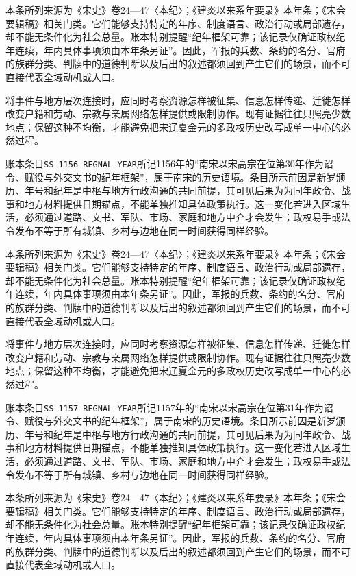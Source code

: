本条所列来源为《宋史》卷24—47〈本纪〉；《建炎以来系年要录》本年条；《宋会要辑稿》相关门类。它们能够支持特定的年序、制度语言、政治行动或局部遗存，却不能无条件化为社会总量。账本特别提醒“纪年框架可靠；该记录仅确证政权纪年连续，年内具体事项须由本年条另证”。因此，军报的兵数、条约的名分、官府的族群分类、判牍中的道德判断以及后出的叙述都须回到产生它们的场景，而不可直接代表全域动机或人口。

将事件与地方层次连接时，应同时考察资源怎样被征集、信息怎样传递、迁徙怎样改变户籍和劳动、宗教与亲属网络怎样提供或限制协作。现有证据往往只照亮少数地点；保留这种不均衡，才能避免把宋辽夏金元的多政权历史改写成单一中心的必然过程。

账本条目\texttt{SS-1156-REGNAL-YEAR}所记1156年的“南宋以宋高宗在位第30年作为诏令、赋役与外交文书的纪年框架”，属于南宋的历史语境。条目所示前因是新岁颁历、年号和纪年是中枢与地方行政沟通的共同前提，其可见后果为为同年政令、战事和地方材料提供日期锚点，不能单独推知具体政策执行。这一变化若进入区域生活，必须通过道路、文书、军队、市场、家庭和地方中介才会发生；政权易手或法令发布不等于所有城镇、乡村与边地在同一时间获得同样经验。

本条所列来源为《宋史》卷24—47〈本纪〉；《建炎以来系年要录》本年条；《宋会要辑稿》相关门类。它们能够支持特定的年序、制度语言、政治行动或局部遗存，却不能无条件化为社会总量。账本特别提醒“纪年框架可靠；该记录仅确证政权纪年连续，年内具体事项须由本年条另证”。因此，军报的兵数、条约的名分、官府的族群分类、判牍中的道德判断以及后出的叙述都须回到产生它们的场景，而不可直接代表全域动机或人口。

将事件与地方层次连接时，应同时考察资源怎样被征集、信息怎样传递、迁徙怎样改变户籍和劳动、宗教与亲属网络怎样提供或限制协作。现有证据往往只照亮少数地点；保留这种不均衡，才能避免把宋辽夏金元的多政权历史改写成单一中心的必然过程。

账本条目\texttt{SS-1157-REGNAL-YEAR}所记1157年的“南宋以宋高宗在位第31年作为诏令、赋役与外交文书的纪年框架”，属于南宋的历史语境。条目所示前因是新岁颁历、年号和纪年是中枢与地方行政沟通的共同前提，其可见后果为为同年政令、战事和地方材料提供日期锚点，不能单独推知具体政策执行。这一变化若进入区域生活，必须通过道路、文书、军队、市场、家庭和地方中介才会发生；政权易手或法令发布不等于所有城镇、乡村与边地在同一时间获得同样经验。

本条所列来源为《宋史》卷24—47〈本纪〉；《建炎以来系年要录》本年条；《宋会要辑稿》相关门类。它们能够支持特定的年序、制度语言、政治行动或局部遗存，却不能无条件化为社会总量。账本特别提醒“纪年框架可靠；该记录仅确证政权纪年连续，年内具体事项须由本年条另证”。因此，军报的兵数、条约的名分、官府的族群分类、判牍中的道德判断以及后出的叙述都须回到产生它们的场景，而不可直接代表全域动机或人口。

